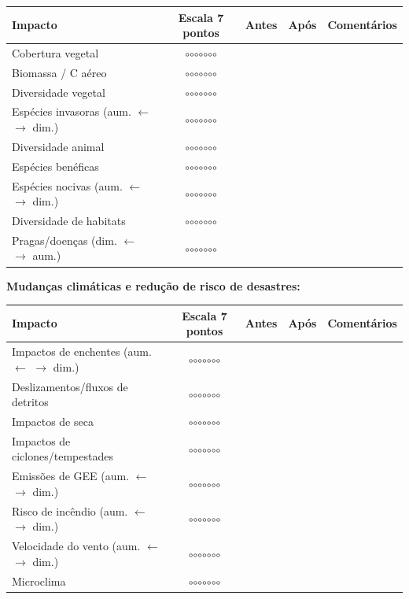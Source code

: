 {
\begin{longtable}[]{@{}lcccl@{}}
\toprule\noalign{}
Impacto & Escala 7 pontos & Antes & Após & Comentários \\
\midrule\noalign{}
\endhead
\bottomrule\noalign{}
\endlastfoot
Cobertura vegetal & $\circ$$\circ$$\circ$$\circ$$\circ$$\circ$$\circ$ & & & \\
Biomassa / C aéreo & $\circ$$\circ$$\circ$$\circ$$\circ$$\circ$$\circ$ & & & \\
Diversidade vegetal & $\circ$$\circ$$\circ$$\circ$$\circ$$\circ$$\circ$ & & & \\
Espécies invasoras (aum. $\leftarrow$ $\rightarrow$ dim.) & $\circ$$\circ$$\circ$$\circ$$\circ$$\circ$$\circ$ & & & \\
Diversidade animal & $\circ$$\circ$$\circ$$\circ$$\circ$$\circ$$\circ$ & & & \\
Espécies benéficas & $\circ$$\circ$$\circ$$\circ$$\circ$$\circ$$\circ$ & & & \\
Espécies nocivas (aum. $\leftarrow$ $\rightarrow$ dim.) & $\circ$$\circ$$\circ$$\circ$$\circ$$\circ$$\circ$ & & & \\
Diversidade de habitats & $\circ$$\circ$$\circ$$\circ$$\circ$$\circ$$\circ$ & & & \\
Pragas/doenças (dim. $\leftarrow$ $\rightarrow$ aum.) & $\circ$$\circ$$\circ$$\circ$$\circ$$\circ$$\circ$ & & & \\
\end{longtable}
}

\textbf{Mudanças climáticas e redução de risco de desastres:}

{
\begin{longtable}[]{@{}lcccl@{}}
\toprule\noalign{}
Impacto & Escala 7 pontos & Antes & Após & Comentários \\
\midrule\noalign{}
\endhead
\bottomrule\noalign{}
\endlastfoot
Impactos de enchentes (aum. $\leftarrow$ $\rightarrow$ dim.) & $\circ$$\circ$$\circ$$\circ$$\circ$$\circ$$\circ$ & & & \\
Deslizamentos/fluxos de detritos & $\circ$$\circ$$\circ$$\circ$$\circ$$\circ$$\circ$ & & & \\
Impactos de seca & $\circ$$\circ$$\circ$$\circ$$\circ$$\circ$$\circ$ & & & \\
Impactos de ciclones/tempestades & $\circ$$\circ$$\circ$$\circ$$\circ$$\circ$$\circ$ & & & \\
Emissões de GEE (aum. $\leftarrow$ $\rightarrow$ dim.) & $\circ$$\circ$$\circ$$\circ$$\circ$$\circ$$\circ$ & & & \\
Risco de incêndio (aum. $\leftarrow$ $\rightarrow$ dim.) & $\circ$$\circ$$\circ$$\circ$$\circ$$\circ$$\circ$ & & & \\
Velocidade do vento (aum. $\leftarrow$ $\rightarrow$ dim.) & $\circ$$\circ$$\circ$$\circ$$\circ$$\circ$$\circ$ & & & \\
Microclima & $\circ$$\circ$$\circ$$\circ$$\circ$$\circ$$\circ$ & & & \\
\end{longtable}
}

